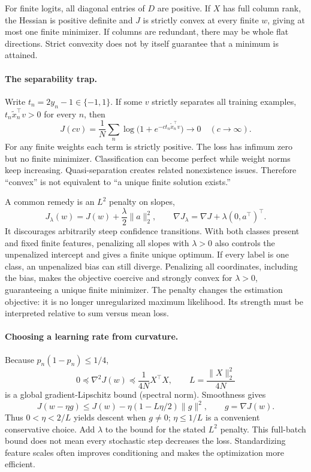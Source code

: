 For finite logits, all diagonal entries of $D$ are positive. If $X$ has full
column rank, the Hessian is positive definite and $J$ is strictly convex at every
finite $w$, giving at most one finite minimizer. If columns are redundant, there
may be whole flat directions. Strict convexity does not by itself guarantee
that a minimum is attained.

\paragraph{The separability trap.}
Write $t_n=2y_n-1\in\{-1,1\}$. If some $v$ strictly separates all training
examples, $t_n\tilde x_n^\top v>0$ for every $n$, then
\[
J(cv)=\frac1N\sum_n\log\bigl(1+e^{-c t_n\tilde x_n^\top v}\bigr)
\longrightarrow0\quad(c\to\infty).
\]
For any finite weights each term is strictly positive. The loss has infimum
zero but no finite minimizer. Classification can become perfect while weight
norms keep increasing. Quasi-separation creates related nonexistence issues.
Therefore ``convex'' is not equivalent to ``a unique finite solution exists.''

A common remedy is an $L^2$ penalty on slopes,
\[
J_\lambda(w)=J(w)+\frac\lambda2\|a\|_2^2,\qquad
\nabla J_\lambda=\nabla J+\lambda(0,a^\top)^\top.
\]
It discourages arbitrarily steep confidence transitions. With both classes
present and fixed finite features, penalizing all slopes with $\lambda>0$ also
controls the unpenalized intercept and gives a finite unique optimum. If every
label is one class, an unpenalized bias can still diverge. Penalizing all
coordinates, including the bias, makes the objective coercive and strongly
convex for $\lambda>0$, guaranteeing a unique finite minimizer. The penalty
changes the estimation objective: it is no longer unregularized maximum
likelihood. Its strength must be interpreted relative to sum versus mean loss.

\paragraph{Choosing a learning rate from curvature.}
Because $p_n(1-p_n)\leq1/4$,
\[
0\preceq\nabla^2J(w)\preceq\frac1{4N}X^\top X,\qquad
L=\frac{\|X\|_2^2}{4N}
\]
is a global gradient-Lipschitz bound (spectral norm). Smoothness gives
\[
J(w-\eta g)\leq J(w)-\eta(1-L\eta/2)\|g\|^2,
\qquad g=\nabla J(w).
\]
Thus $0<\eta<2/L$ yields descent when $g\ne0$; $\eta\leq1/L$ is a convenient
conservative choice. Add $\lambda$ to the bound for the stated $L^2$ penalty.
This full-batch bound does not mean every stochastic step decreases the loss.
Standardizing feature scales often improves conditioning and makes the
optimization more efficient.

